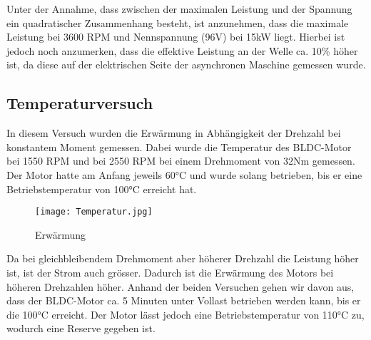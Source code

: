 Unter der Annahme, dass zwischen der maximalen Leistung und der Spannung ein quadratischer Zusammenhang besteht, ist anzunehmen, dass die maximale Leistung bei 3600 RPM und Nennspannung (96V) bei 15kW liegt. Hierbei ist jedoch noch anzumerken, dass die effektive Leistung an der Welle ca. 10\% höher ist, da diese auf der elektrischen Seite der asynchronen Maschine gemessen wurde.

\subsection{Temperaturversuch}
In diesem Versuch wurden die Erwärmung in Abhängigkeit der Drehzahl bei konstantem Moment gemessen. Dabei wurde die Temperatur des BLDC-Motor bei 1550 RPM und bei 2550 RPM bei einem Drehmoment von 32Nm gemessen. Der Motor hatte am Anfang jeweils 60°C und wurde solang betrieben, bis er eine Betriebstemperatur von 100°C erreicht hat.


\begin{figure}[H]
	\centering
	\texttt{[image: Temperatur.jpg]}
	\caption{Erwärmung}\label{fig:Temperatur}
\end{figure}


Da bei gleichbleibendem Drehmoment aber höherer Drehzahl die Leistung höher ist, ist der Strom auch grösser. Dadurch ist die Erwärmung des Motors bei höheren Drehzahlen höher. Anhand der beiden Versuchen gehen wir davon aus, dass der BLDC-Motor ca. 5 Minuten unter Vollast betrieben werden kann, bis er die 100°C erreicht. Der Motor lässt jedoch eine Betriebstemperatur von 110°C zu, wodurch eine Reserve gegeben ist.
 